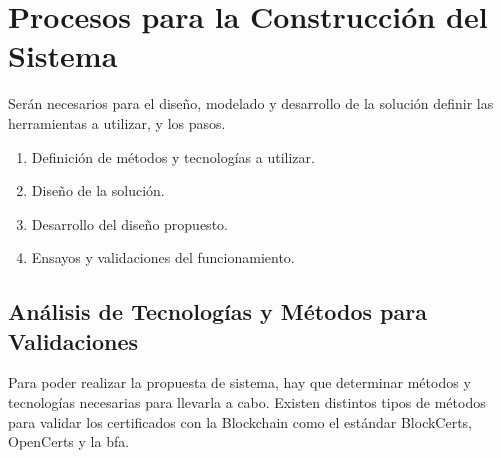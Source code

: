 \section{Procesos para la Construcción del Sistema}
Serán necesarios para el diseño, modelado y desarrollo de la solución definir las herramientas a utilizar,
y los pasos.
\begin{enumerate}
    \item Definición de métodos y tecnologías a utilizar.
    \item Diseño de la solución.
    \item Desarrollo del diseño propuesto.
    \item Ensayos y validaciones del funcionamiento.
\end{enumerate}


\subsection{ Análisis de Tecnologías y Métodos para Validaciones}
Para poder realizar la propuesta de sistema, hay que determinar métodos y tecnologías  necesarias para llevarla a cabo.
Existen distintos tipos de métodos para validar los certificados con la  Blockchain como el estándar BlockCerts, OpenCerts y la \gls{bfa}.





